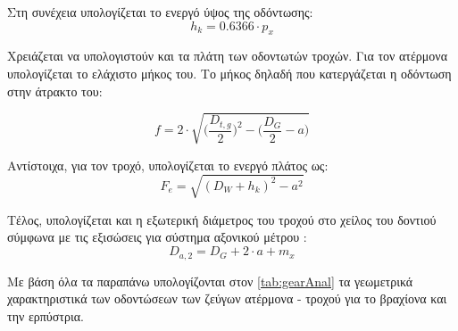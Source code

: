 Στη συνέχεια υπολογίζεται το ενεργό ύψος της οδόντωσης:
\begin{equation}
    h_k = 0.6366 \cdot p_x
\end{equation}

Χρειάζεται να υπολογιστούν και τα πλάτη των οδοντωτών τροχών. Για τον ατέρμονα υπολογίζεται το ελάχιστο μήκος του. Το μήκος δηλαδή που κατεργάζεται η οδόντωση στην άτρακτο του:

\begin{equation}
    f = 2\cdot \sqrt{\bigg(\frac{D_{t,g}}{2}\bigg)^2 - \bigg(   \frac{D_G}{2} -a      \bigg)}
\end{equation}

Αντίστοιχα, για τον τροχό, υπολογίζεται το ενεργό πλάτος ως:
\begin{equation}
    F_{e} = \sqrt{(D_W + h_k)^2 - a^2}
\end{equation}


Τέλος, υπολογίζεται και η εξωτερική διάμετρος του τροχού στο χείλος του δοντιού σύμφωνα με τις εξισώσεις για σύστημα αξονικού μέτρου \cite{khk}:
\begin{equation}
    D_{a,2} = D_G + 2\cdot a + m_x
\end{equation}


Με βάση όλα τα παραπάνω υπολογίζονται στον \ref{tab:gearAnal} τα γεωμετρικά χαρακτηριστικά των οδοντώσεων των ζεύγων ατέρμονα - τροχού για το βραχίονα και την ερπύστρια.

